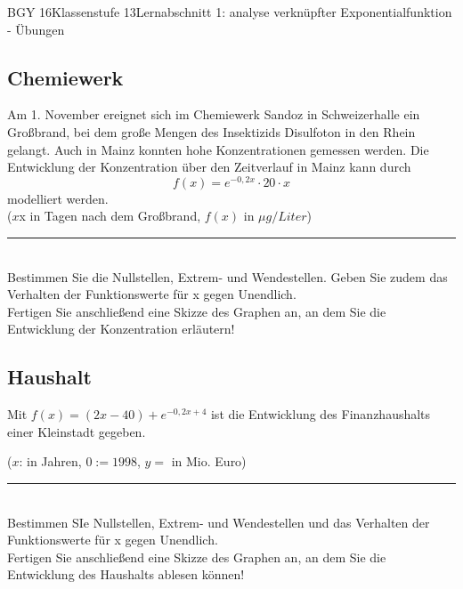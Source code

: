 \documentclass[oneside,openany,headings=optiontotoc,11pt,numbers=noenddot]{scrreprt}
\begin{document}
\begin{worksheet}{BGY 16}{Klassenstufe 13}{Lernabschnitt 1: analyse verknüpfter Exponentialfunktion - Übungen}
\begin{framed}
			\section*{Chemiewerk}
			Am 1. November ereignet sich im Chemiewerk Sandoz in Schweizerhalle ein Großbrand, bei dem große Mengen des Insektizids \grqq{}Disulfoton\grqq{} in den Rhein gelangt. Auch in Mainz konnten hohe Konzentrationen gemessen werden. Die Entwicklung der Konzentration über den Zeitverlauf in Mainz kann durch \[f(x) = e^{-0,2x}\cdot{}20\cdot{}x\] modelliert werden.\\
			(\(x\)x in Tagen nach dem Großbrand, \(f(x)\) in \(\mu{}g/Liter\))\\
			\par\noindent
			\rule{\textwidth}{0.1pt}\\
			Bestimmen Sie die Nullstellen, Extrem- und Wendestellen. Geben Sie zudem das Verhalten der Funktionswerte für x gegen Unendlich.\\
			Fertigen Sie anschließend eine Skizze des Graphen an, an dem Sie die Entwicklung der Konzentration erläutern!
		\end{framed}
		\begin{framed}
			\noindent
			\section*{Haushalt}
			Mit \(f(x) = (2x-40)+e^{-0,2x+4}\) ist die Entwicklung des Finanzhaushalts einer Kleinstadt gegeben.\\
			\par\noindent
			(\(x\): in Jahren, \(0:= 1998\), \(y = \) in Mio. Euro)\\
			\par\noindent
			\rule{\textwidth}{0.1pt}\\
			Bestimmen SIe Nullstellen, Extrem- und Wendestellen und das Verhalten der Funktionswerte für x gegen Unendlich.\\
			Fertigen Sie anschließend eine Skizze des Graphen an, an dem Sie die Entwicklung des Haushalts ablesen können!
		\end{framed}
		\begin{framed}
			\noindent

\end{framed}
\end{worksheet}
\end{document}
